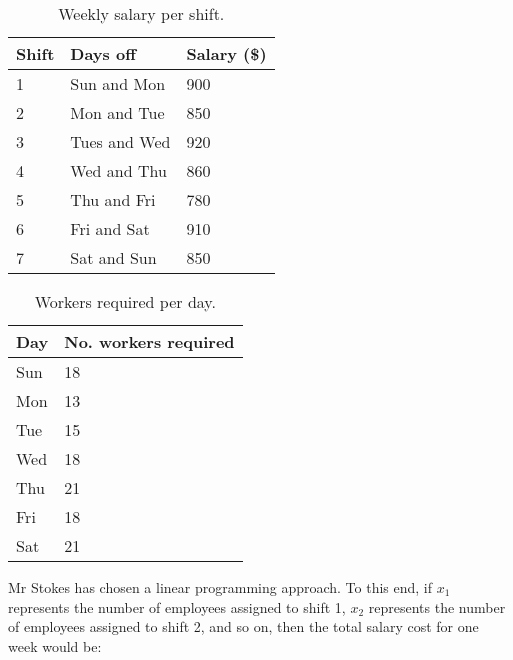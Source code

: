 \documentclass[11pt, a4paper]{article}
\begin{document}
    \begin{table}[!ht]
        \centering
        \caption{Weekly salary per shift.}
        \begin{tabular}{|l|l|l|}
            \hline
            Shift   & Days off      & Salary (\$)  \\ \hline
            1       & Sun and Mon   & 900          \\ \hline
            2       & Mon and Tue   & 850          \\ \hline
            3       & Tues and Wed  & 920          \\ \hline
            4       & Wed and Thu   & 860          \\ \hline
            5       & Thu and Fri   & 780          \\ \hline
            6       & Fri and Sat   & 910          \\ \hline
            7       & Sat and Sun   & 850          \\ \hline
        \end{tabular}
        \label{shifts}
    \end{table}

    \begin{table}[!ht]
        \centering
        \caption{Workers required per day.}
        \begin{tabular}{|l|l|}
            \hline
            Day     & No. workers required  \\ \hline
            Sun     & 18                    \\ \hline
            Mon     & 13                    \\ \hline
            Tue     & 15                    \\ \hline
            Wed     & 18                    \\ \hline
            Thu     & 21                    \\ \hline
            Fri     & 18                    \\ \hline
            Sat     & 21                    \\ \hline     
        \end{tabular}
        \label{workers_needed}
    \end{table}

    Mr Stokes has chosen a linear programming approach. To this end, if $x_{1}$ represents the number of employees assigned to shift 1, $x_{2}$ represents the number of employees assigned to shift 2, and so on, then the total salary cost for one week would be:
\end{document}
